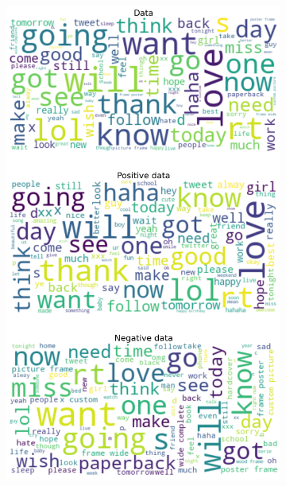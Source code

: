 \documentclass{article}
\begin{document}
\begin{itemize}
\begin{figure}[H]
\begin{subfigure}[b]{0.24\textwidth}
      \includegraphics[width=\textwidth]{chapter-06/section-01-01/07/visualization/2/wordcloud.png}
    \end{subfigure}
    \begin{subfigure}[b]{0.24\textwidth}
      \centering

\end{subfigure}
\end{figure}
\end{itemize}
\end{document}
